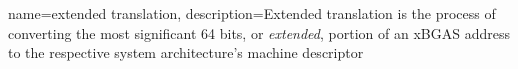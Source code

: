 
{
  name=extended translation,
  description={Extended translation is the process of converting the most
  significant 64 bits, or \textit{extended}, portion of an xBGAS address to
  the respective system architecture's machine descriptor}
}
